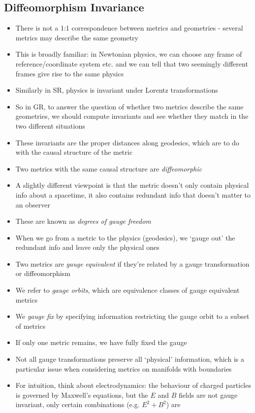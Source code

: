 \documentclass[12pt,a4paper]{article}
\numberwithin{equation}{section}
\begin{document}
	\subsection{Diffeomorphism Invariance}
	\begin{itemize}
		\item There is not a 1:1 correspondence between metrics and geometries - several metrics may describe the same geometry
		\item This is broadly familiar: in Newtonian physics, we can choose any frame of reference/coordinate system etc. and we can tell that two seemingly different frames give rise to the same physics
		\item Similarly in SR, physics is invariant under Lorentz transformations
		\item So in GR, to answer the question of whether two metrics describe the same geometries, we should compute invariants and see whether they match in the two different situations
		\item These invariants are the proper distances along geodesics, which are to do with the causal structure of the metric
		\item Two metrics with the same causal structure are \textit{diffeomorphic}
		\item A slightly different viewpoint is that the metric doesn't only contain physical info about a spacetime, it also contains redundant info that doesn't matter to an observer
		\item These are known as \textit{degrees of gauge freedom}
		\item When we go from a metric to the physics (geodesics), we `gauge out' the redundant info and leave only the physical ones
		\item Two metrics are \textit{gauge equivalent} if they're related by a gauge transformation or diffeomorphism
		\item We refer to \textit{gauge orbits}, which are equivalence classes of gauge equivalent metrics
		\item We \textit{gauge fix} by specifying information restricting the gauge orbit to a subset of metrics
		\item If only one metric remains, we have fully fixed the gauge
		\item Not all gauge transformations preserve all `physical' information, which is a particular issue when considering metrics on manifolds with boundaries
		\item For intuition, think about electrodynamics: the behaviour of charged particles is governed by Maxwell's equations, but the $E$ and $B$ fields are not gauge invariant, only certain combinations (e.g. $E^{2}+B^{2}$) are

\end{itemize}
\end{document}
